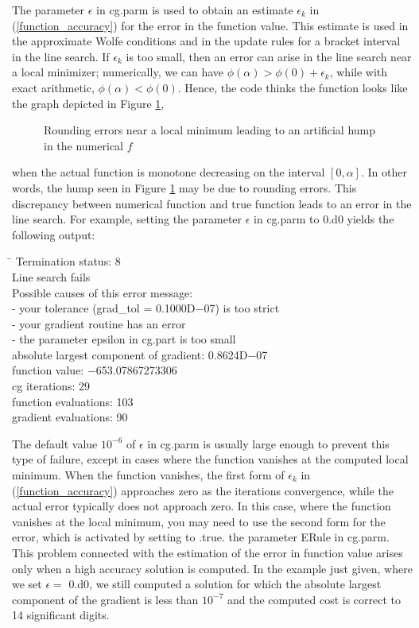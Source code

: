 \documentclass [12pt] {article}
\newcommand{\postscript}[2]
{\setlength{\epsfxsize}{#2\hsize}
\centerline{\epsfbox{#1}}}
\begin{document}
The parameter $\epsilon$ in {\sc cg.parm}
is used
to obtain an estimate $\epsilon_k$
in (\ref{function_accuracy})
for the error in the function value.
This estimate is used in the
approximate Wolfe conditions and in the update rules for a bracket
interval in the line search.
If $\epsilon_k$ is too small, then an error can arise in the line search
near a local minimizer;
numerically, we can have
$\phi (\alpha) > \phi (0) + \epsilon_k$,
while with exact arithmetic, 
$\phi (\alpha) < \phi (0)$.
Hence, the code thinks the function looks like the graph depicted
in Figure \ref{rounding},
%
\begin{figure}
\begin{center}
\postscript{rounding.eps}{.7}
\caption{Rounding errors near a local minimum leading to an artificial
hump in the numerical $f$}
\label{rounding}
\end{center}
\end{figure}
%
when the actual function is monotone decreasing
on the interval $[0, \alpha]$.
In other words, the hump seen in Figure \ref{rounding}
may be due to rounding errors.
This discrepancy between numerical function and true
function leads to an error in the line search.
For example, setting the parameter $\epsilon$ in {\sc cg.parm} to 0.d0 yields
the following output:
\begin{tabbing}
\hspace{2em} \= \kill
\> \sc Termination status:  8 \\
\> \sc Line search fails \\
\> \sc Possible causes of this error message: \\
\> \sc   - your tolerance (grad\_tol = 0.1000D$-$07) is too strict \\
\> \sc   - your gradient routine has an error \\
\> \sc   - the parameter epsilon in cg.part is too small \\
\> \sc absolute largest component of gradient: 0.8624D$-$07 \\
\> \sc function value:   $-$653.07867273306 \\
\> \sc cg iterations:  29 \\
\> \sc function evaluations:  103 \\
\> \sc gradient evaluations:  90
\end{tabbing}
The default value $10^{-6}$
of $\epsilon$ in {\sc cg.parm} is
usually large enough to prevent this type of failure, except in
cases where the function vanishes at the computed local minimum.
When the function vanishes, the first form of $\epsilon_k$ in
(\ref{function_accuracy}) approaches zero as the iterations convergence,
while the actual error typically does not approach zero.
In this case, where the function vanishes at the local minimum,
you may need to use the second form for the error, which is
activated by setting to .true. the parameter {\sc ERule} in {\sc cg.parm}.
This problem connected with the estimation of the error in function value
arises only when a high accuracy solution is computed.
In the example just given, where we set $\epsilon =$ 0.d0, we still
computed a solution for which the absolute largest component of the
gradient is less than $10^{-7}$ and the computed cost
is correct to 14 significant digits.
\end{document}
